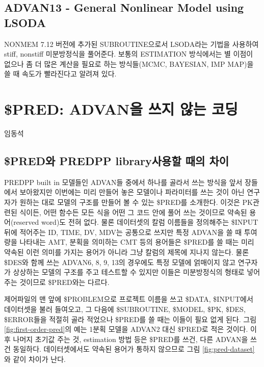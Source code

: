 \documentclass[
  10pt,
  krantz2,
  a4paper]{krantz}
\theoremstyle{definition}
\theoremstyle{definition}
\theoremstyle{definition}
\theoremstyle{remark}
\begin{document}
\hypertarget{advan13---general-nonlinear-model-using-lsoda}{%
\section{ADVAN13 - General Nonlinear Model using LSODA}\label{advan13---general-nonlinear-model-using-lsoda}}

NONMEM 7.12 버전에 추가된 SUBROUTINE으로서 LSODA라는 기법을 사용하여 stiff, nonstiff 미분방정식을 풀어준다. 보통의 ESTIMATION 방식에서는 별 이점이 없으나 좀 더 많은 계산을 필요로 하는 방식들(MCMC, BAYESIAN, IMP MAP)을 쓸 때 속도가 빨라진다고 알려져 있다.

\hypertarget{PRED}{%
\chapter{\$PRED: ADVAN을 쓰지 않는 코딩}\label{PRED}}

임동석

\hypertarget{preduxc640-predpp-libraryuxc0acuxc6a9uxd560-uxb54cuxc758-uxcc28uxc774}{%
\section{\$PRED와 PREDPP library사용할 때의 차이}\label{preduxc640-predpp-libraryuxc0acuxc6a9uxd560-uxb54cuxc758-uxcc28uxc774}}

PREDPP built in 모델들인 ADVAN들 중에서 하나를 골라서 쓰는 방식을 앞서 장들에서 보아왔지만 이번에는 미리 만들어 놓은 모델이나 파라미터를 쓰는 것이 아닌 연구자가 원하는 대로 모델의 구조를 만들어 볼 수 있는 \$PRED를 소개한다. 이것은 PK관련된 식이든, 어떤 함수든 모든 식을 어떤 그 코드 안에 풀어 쓰는 것이므로 약속된 용어(reserved word)도 전혀 없다. 물론 데이터셋의 칼럼 이름들을 정의해주는 \$INPUT 뒤에 적어주는 ID, TIME, DV, MDV는 공통으로 쓰지만 특정 ADVAN을 쓸 때 투여량을 나타내는 AMT, 분획을 의미하는 CMT 등의 용어들은 \$PRED를 쓸 때는 미리 약속된 이런 의미를 가지는 용어가 아니라 그냥 칼럼의 제목에 지나지 않는다. 물론 \$DES와 함께 쓰는 ADVAN6, 8, 9, 13의 경우에도 특정 모델에 얽매이지 않고 연구자가 상상하는 모델의 구조를 주고 테스트할 수 있지만 이들은 미분방정식의 형태로 넣어주는 것이므로 \$PRED와는 다르다.

제어파일의 맨 앞에 \$PROBLEM으로 프로젝트 이름을 쓰고 \$DATA, \$INPUT에서 데이터셋을 불러 들여오고, 그 다음에 \$SUBROUTINE, \$MODEL, \$PK, \$DES, \$ERROR들을 적절히 골라 적었으나 \$PRED를 쓸 때는 이들이 필요 없게 된다. 그림 \ref{fig:first-order-pred}의 예는 1분획 모델을 ADVAN2 대신 \$PRED로 적은 것이다. 이후 나머지 초기값 주는 것, estimation 방법 등은 \$PRED를 쓰건, 다른 ADVAN을 쓰건 동일하다. 데이터셋에서도 약속된 용어가 통하지 않으므로 그림 \ref{fig:pred-dataset}와 같이 차이가 난다.
\end{document}
